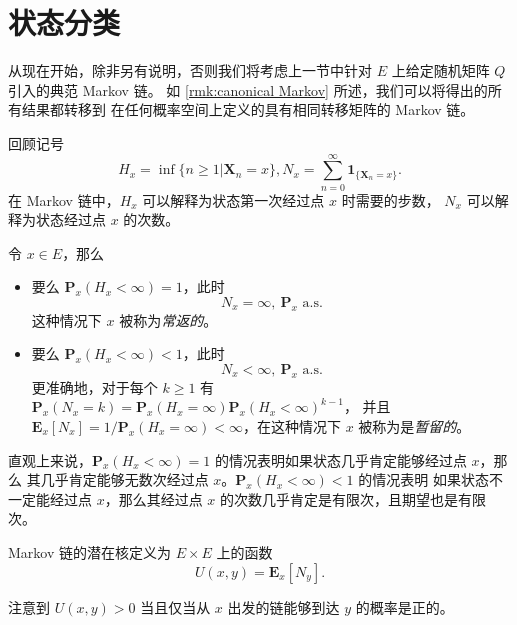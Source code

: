 \documentclass[fontset=none]{Notes}
\newcommand{\mat}[1]{\mathbold{#1}}
\newcommand{\matup}[1]{\mathbf{#1}}
\newcommand{\indicator}[1]{\mathbold 1_{#1}}
\newcommand{\alsu}[1]{\text{$#1$ a.s.}}
\begin{document}
\section{状态分类}

从现在开始，除非另有说明，否则我们将考虑上一节中针对 $E$ 上给定随机矩阵 $Q$ 引入的典范 Markov 链。
如 \autoref{rmk:canonical Markov} 所述，我们可以将得出的所有结果都转移到
在任何概率空间上定义的具有相同转移矩阵的 Markov 链。

回顾记号
\[
  H_x=\inf\{n\geq 1| \mat X_n=x\}, N_x=\sum_{n=0}^\infty \indicator{\{\mat X_n=x\}}.
\]
在 Markov 链中，$H_x$ 可以解释为状态第一次经过点 $x$ 时需要的步数，
$N_x$ 可以解释为状态经过点 $x$ 的次数。

\begin{proposition}\label{prop:recurrent and transient}
  令 $x\in E$，那么
  \begin{itemize}
    \item 要么 $\matup P_x(H_x<\infty)=1$，此时
    \[
      N_x=\infty,\ \alsu{\matup P_x}
    \]
    这种情况下 $x$ 被称为\emph{常返的}。
    \item 要么 $\matup P_x(H_x<\infty)<1$，此时
    \[
      N_x<\infty,\ \alsu{\matup P_x}
    \]
    更准确地，对于每个 $k\geq 1$ 有 $\matup P_x(N_x=k)=\matup P_x(H_x=\infty)\matup P_x(H_x<\infty)^{k-1}$，
    并且 $\matup E_x[N_x]=1/\matup P_x(H_x=\infty)<\infty$，在这种情况下 $x$
    被称为是\emph{暂留的}。
  \end{itemize}
\end{proposition}
\begin{remark}
  直观上来说，$\matup P_x(H_x<\infty)=1$ 的情况表明如果状态几乎肯定能够经过点 $x$，那么
  其几乎肯定能够无数次经过点 $x$。$\matup P_x(H_x<\infty)<1$ 的情况表明
  如果状态不一定能经过点 $x$，那么其经过点 $x$ 的次数几乎肯定是有限次，且期望也是有限次。
\end{remark}

\begin{definition}
  Markov 链的潜在核定义为 $E\times E$ 上的函数 
  \[
    U(x,y)=\matup E_x[N_y].
  \]
\end{definition}

注意到 $U(x,y)>0$ 当且仅当从 $x$ 出发的链能够到达 $y$ 的概率是正的。
\end{document}
